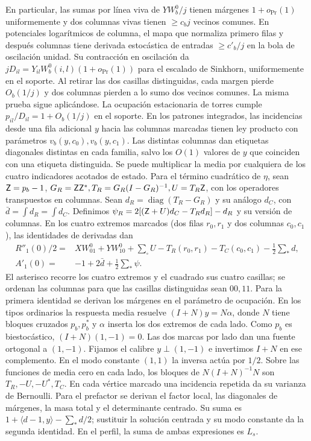 En particular, las sumas por línea viva de \(YW_b^0/j\) tienen márgenes \(1+o_{\Pr}(1)\)
uniformemente y dos columnas vivas tienen \(\ge c_bj\) vecinos comunes. En potenciales
logarítmicos de columna, el mapa que normaliza primero filas y después columnas tiene
derivada estocástica de entradas \(\ge c'_b/j\) en la bola de oscilación unidad. Su
contracción en oscilación da \(jD_{il}=Y_{il}W_b^0(i,l)(1+o_{\Pr}(1))\) para el escalado
de Sinkhorn, uniformemente en el soporte. Al retirar las dos casillas distinguidas, cada
margen pierde \(O_b(1/j)\) y dos columnas pierden a lo sumo dos vecinos comunes. La misma
prueba sigue aplicándose. La ocupación estacionaria de torres cumple
\(p_{il}/D_{il}=1+O_b(1/j)\) en el soporte. En los patrones integrados, las incidencias desde una
fila adicional \(y\) hacia las columnas marcadas tienen ley producto con parámetros
\(v_b(y,c_0),v_b(y,c_1)\). Las distintas columnas dan etiquetas diagonales distintas en cada
familia, salvo los \(O(1)\) valores de \(y\) que coinciden con una etiqueta distinguida.
Se puede multiplicar la media por cualquiera de los cuatro indicadores acotados de estado.
Para el término cuadrático de \(\eta\), sean \(\mathsf Z=p_b-1\),
\(G_R=\mathsf Z\mathsf Z^*, T_R=G_R(I-G_R)^{-1}, U=T_R\mathsf Z\), con los operadores transpuestos en
 columnas.
Sean \(d_R=\operatorname{diag}(T_R-G_R)\) y su análogo \(d_C\), con
\(\bar d=\int d_R=\int d_C\). Definimos
\(\psi_R=2[(\mathsf Z+U)d_C-T_Rd_R]-d_R\) y su versión de columnas. En los cuatro extremos
marcados (dos filas \(r_0,r_1\) y dos columnas \(c_0,c_1\)), las identidades de derivadas dan
\begin{align*}
 R''_1(0)/2={}&XW^0_{01}+YW^0_{10}+\sum_{\square} U-T_R(r_0,r_1)-T_C(c_0,c_1)
              -\tfrac12\sum_* d,\\
 A'_1(0)={}&-1+2\bar d+\tfrac12\sum_* \psi .
\end{align*}
El asterisco recorre los cuatro extremos y el cuadrado sus cuatro casillas; se ordenan las columnas
para que las casillas distinguidas sean \(00,11\). Para la primera identidad se derivan los
márgenes en el parámetro de ocupación. En los tipos ordinarios la respuesta media resuelve
\((I+N)y=N\alpha\), donde \(N\) tiene bloques cruzados \(p_b,p_b^*\) y \(\alpha\) inserta
los dos extremos de cada lado. Como \(p_b\) es biestocástico, \((I+N)(1,-1)=0\).
Las dos marcas por lado dan una fuente ortogonal a \((1,-1)\). Fijamos el calibre
\(y\perp(1,-1)\) e invertimos \(I+N\) en ese complemento. En el modo constante \((1,1)\)
la inversa actúa por \(1/2\). Sobre las funciones de media cero en cada lado, los bloques
de \(N(I+N)^{-1}N\) son \(T_R,-U,-U^*,T_C\).
En cada vértice marcado una incidencia repetida da su varianza de Bernoulli. Para el prefactor
se derivan el factor local, las diagonales de márgenes, la masa total y el determinante centrado.
Su suma es \(1+\langle d-1,y\rangle-\sum_*d/2\); sustituir la solución centrada y su modo
constante da la segunda identidad. En el perfil, la suma de ambas expresiones es \(L_s\).

